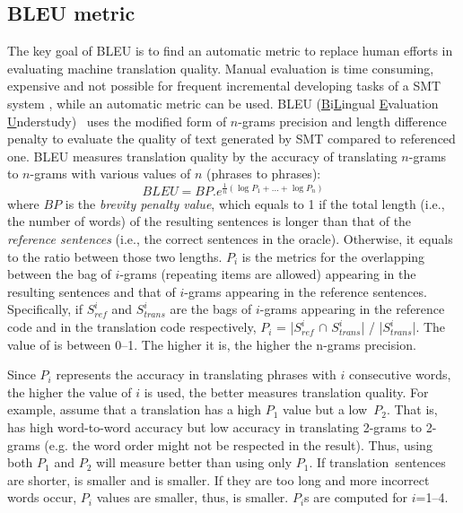 \subsection{BLEU metric}

The key goal of BLEU is to find an automatic metric to replace human
efforts in evaluating machine translation quality. Manual evaluation
is time consuming, expensive and not possible for frequent incremental
developing tasks of a SMT system \cite{Papineni2002}, while an
automatic metric can be used. BLEU
(\underline{B}i\underline{L}ingual \underline{E}valuation
\underline{U}nderstudy)~\cite{Papineni2002} uses the modified form of $n$-grams precision
and length difference penalty to evaluate the quality of text
generated by SMT compared to referenced one.
%
BLEU measures translation quality by the accuracy of translating
$n$-grams to $n$-grams with various values of $n$ (phrases to
phrases):
\[BLEU = BP.{e^{\frac{1}{n}(\log {P_1} + ... + \log {P_n})}}\]
where $BP$ is the {\em brevity penalty value}, which equals to 1 if
the total length (i.e., the number of words) of the resulting sentences
is longer than that of the {\em reference sentences} (i.e., the correct
sentences in the oracle). Otherwise, it equals to the ratio between
those two lengths. $P_i$ is the metrics for the overlapping between
the bag of $i$-grams (repeating items are allowed) appearing in the
resulting sentences and that of $i$-grams appearing in the reference
sentences. Specifically, if $S^{i}_{ref}$ and $S^{i}_{trans}$ are the
bags of $i$-grams appearing in the reference code and in the
translation code respectively, $P_i$ = |$S^{i}_{ref}$ $\cap$
$S^{i}_{trans}$| / |$S^{i}_{trans}$|. The value of  is
between 0--1. The higher it is, the higher the n-grams precision.

Since $P_i$ represents the accuracy in translating phrases
with $i$ consecutive words, the higher the value of $i$ is used, the
better  measures translation quality. For example, assume
that a translation  has a high $P_1$ value but a
low~$P_2$. That is,  has high word-to-word accuracy but low
accuracy in translating 2-grams to 2-grams (e.g. the word order might
not be respected in the result). Thus, using both $P_1$ and $P_2$ will
measure  better than using only $P_1$. If
translation~sen\-tences are shorter,  is smaller and
 is smaller. If they are too long and more incorrect words
occur, $P_i$ values are smaller, thus,  is smaller. $P_i$s
are computed for $i$=1--4.
